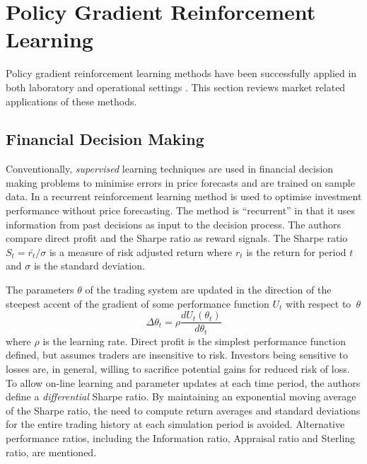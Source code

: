 \section{Policy Gradient Reinforcement Learning}
Policy gradient reinforcement learning methods have been successfully applied in
both laboratory and operational settings
\cite{barto:policy,shaal:robots,peshkin:routing}.  This section reviews
market related applications of these methods.

\subsection{Financial Decision Making}
\label{sec:moody}
Conventionally, \textit{supervised} learning techniques are used in financial
decision making problems to minimise errors in price forecasts and are trained
on sample data.  In  a recurrent reinforcement learning method
is used to optimise investment performance without price forecasting. The method
is ``recurrent'' in that it uses information from past decisions as input to the
decision process.  The authors compare direct profit and the Sharpe ratio
\cite{sharpe:ratio66,sharpe:ratio94} as reward signals. The Sharpe ratio $S_t =
\bar{r_t} / \sigma$ is a measure of risk adjusted return
where $r_t$ is the return for period $t$ and $\sigma$ is the standard deviation.

The parameters $\theta$ of the trading system are updated in the direction of
the steepest accent of the gradient of some performance function $U_t$ with
respect to~$\theta$
\begin{equation}
\Delta\theta_t = \rho \frac{dU_t(\theta_t)}{d\theta_t}
\end{equation}
where $\rho$ is the learning rate.  Direct profit is the simplest performance
function defined, but assumes traders are insensitive to risk.  Investors
being sensitive to losses are, in general, willing to sacrifice potential gains
for reduced risk of loss. To allow on-line learning and parameter updates at
each time period, the authors define a \textit{differential} Sharpe ratio.  By maintaining an
exponential moving average of the Sharpe ratio, the need to compute return
averages and standard deviations for the entire trading history at each
simulation period is avoided.  Alternative performance ratios, including the
Information ratio, Appraisal ratio and Sterling ratio, are mentioned.

